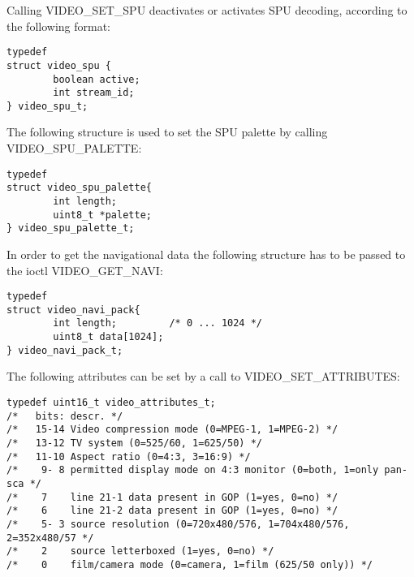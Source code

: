 \label{videospu}
Calling VIDEO\_SET\_SPU deactivates or activates SPU decoding,
according to the following format:
\begin{verbatim}
typedef 
struct video_spu {
        boolean active;
        int stream_id;
} video_spu_t;
\end{verbatim}


\label{vspupal}
The following structure is used to set the SPU palette by calling VIDEO\_SPU\_PALETTE:
\begin{verbatim}
typedef 
struct video_spu_palette{
        int length;
        uint8_t *palette;
} video_spu_palette_t;
\end{verbatim}

\label{videonavi}
In order to get the navigational data the following structure has to
be passed to the ioctl VIDEO\_GET\_NAVI:
\begin{verbatim}
typedef 
struct video_navi_pack{
        int length;         /* 0 ... 1024 */
        uint8_t data[1024];
} video_navi_pack_t;
\end{verbatim}


\label{vattrib}
The following attributes can be set by a call to VIDEO\_SET\_ATTRIBUTES:
\begin{verbatim}
typedef uint16_t video_attributes_t;
/*   bits: descr. */
/*   15-14 Video compression mode (0=MPEG-1, 1=MPEG-2) */
/*   13-12 TV system (0=525/60, 1=625/50) */
/*   11-10 Aspect ratio (0=4:3, 3=16:9) */
/*    9- 8 permitted display mode on 4:3 monitor (0=both, 1=only pan-sca */
/*    7    line 21-1 data present in GOP (1=yes, 0=no) */
/*    6    line 21-2 data present in GOP (1=yes, 0=no) */
/*    5- 3 source resolution (0=720x480/576, 1=704x480/576, 2=352x480/57 */
/*    2    source letterboxed (1=yes, 0=no) */
/*    0    film/camera mode (0=camera, 1=film (625/50 only)) */
\end{verbatim}


\clearpage


